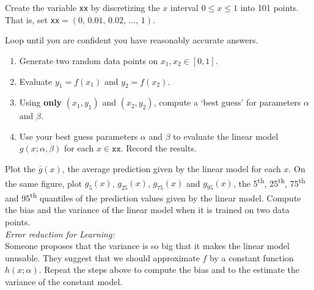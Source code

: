 \noindent Create the variable \texttt{xx} by discretizing the $x$ interval $0 \leq x \leq 1$ into 101 points. 
That is, set \texttt{xx}$ = (0,\, 0.01,\, 0.02,\, \dots,\, 1)$.

\noindent Loop until you are confident you have reasonably accurate answers.
\begin{enumerate}\setlength{\itemsep}{0pt}
    \item Generate two random data points on $x_1, x_2 \in [0,1]$.
    \item Evaluate $y_1 =f(x_1)$ and $y_2 = f(x_2)$.
    \item Using \textbf{only} $(x_1,y_1)$ and $(x_2,y_2)$, compute a `best guess' for parameters $\alpha$ and $\beta$.
    \item Use your best guess parameters $\alpha$ and $\beta$ to evaluate the linear model $g(x;\alpha, \beta)$ for each $x \in \texttt{xx}$. Record the results.
\end{enumerate}
Plot the $\bar{g}(x)$, the average prediction given by the linear model for each $x$. 
On the same figure, plot $g_{5}(x)$, $g_{25}(x)$, $g_{75}(x)$ and $g_{95}(x)$, the 5\textsuperscript{th}, 25\textsuperscript{th}, 75\textsuperscript{th} and 95\textsuperscript{th} quantiles of the prediction values given by the linear model.  
Compute the bias and the variance of the linear model when it is trained on two data points. \\

\noindent\textit{Error reduction for Learning:}\\
Someone proposes that the variance is so big that it makes the linear model unusable.  
They suggest that we should approximate $f$ by a constant function  $h(x;\alpha)$. 
Repeat the steps above to compute the bias and to the estimate the variance of the constant model. \\


